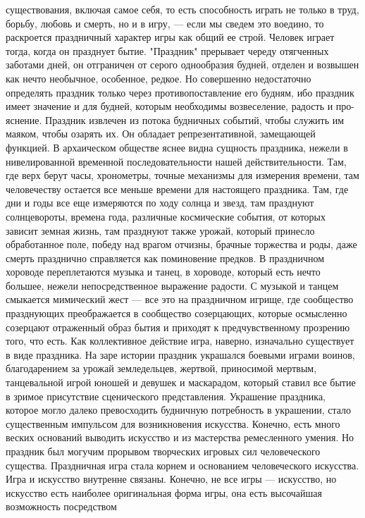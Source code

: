 \documentclass[12pt]{article}
\begin{document}
существования, включая самое себя, то есть способность играть не только в труд, борьбу, любовь и смерть, но и
в игру, --- если мы сведем это воедино, то раскроется праздничный характер игры как общий ее строй. Человек
играет тогда, когда он празднует бытие. "Праздник" прерывает череду отягченных заботами дней, он отграничен
от серого однообразия будней, отделен и возвышен как нечто необычное, особенное, редкое. Но совершенно
недостаточно определять праздник только через противопоставление его будням, ибо праздник имеет значение
и  для  будней,  которым  необходимы  возвеселение,  радость  и  про-яснение.  Праздник  извлечен  из  потока
будничных событий, чтобы служить им маяком, чтобы озарять их. Он обладает репрезентативной, замещающей
функцией. В архаическом обществе яснее видна сущность праздника, нежели в нивелированной временной
последовательности нашей действительности. Там, где верх берут часы, хронометры, точные механизмы для
измерения времени, там человечеству остается все меньше времени для настоящего праздника. Там, где дни и
годы все еще измеряются по ходу солнца и звезд, там празднуют солнцевороты, времена года, различные
космические события, от которых зависит земная жизнь, там празднуют также урожай, который принесло
обработанное  поле,  победу  над  врагом  отчизны,  брачные  торжества  и  роды,  даже  смерть  празднично
справляется как поминовение предков. В праздничном хороводе переплетаются музыка и танец, в хороводе,
который есть нечто большее, нежели непосредственное выражение радости. С музыкой и танцем смыкается
мимический жест --- все это на праздничном игрище, где сообщество празднующих преображается в сообщество
созерцающих,  которые  осмысленно  созерцают  отраженный  образ  бытия  и  приходят  к  предчувственному
прозрению того, что есть. Как коллективное действие игра, наверно, изначально существует в виде праздника.
На заре истории праздник украшался боевыми играми воинов, благодарением за урожай земледельцев, жертвой,
приносимой мертвым, танцевальной игрой юношей и девушек и маскарадом, который ставил все бытие в
зримое присутствие сценического представления. Украшение праздника, которое могло далеко превосходить
будничную потребность в украшении, стало существенным импульсом для возникновения искусства. Конечно,
есть много веских оснований выводить искусство и из мастерства ремесленного умения. Но праздник был
могучим  прорывом  творческих  игровых  сил  человеческого  существа.  Праздничная  игра  стала  корнем  и
основанием человеческого искусства. Игра и искусство внутренне связаны. Конечно, не все игры --- искусство,
но  искусство  есть  наиболее  оригинальная  форма  игры,  она  есть  высочайшая  возможность  посредством
\end{document}
